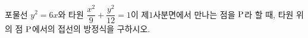 포물선 $y^2=6x$와 타원 $\dfrac{x^2}{9}+\dfrac{y^2}{12}=1$이 제$1$사분면에서 만나는 점을 $\mathrm{P}$라 할 때, 타원 위의 점 $\mathrm{P}$에서의 접선의 방정식을 구하시오.
